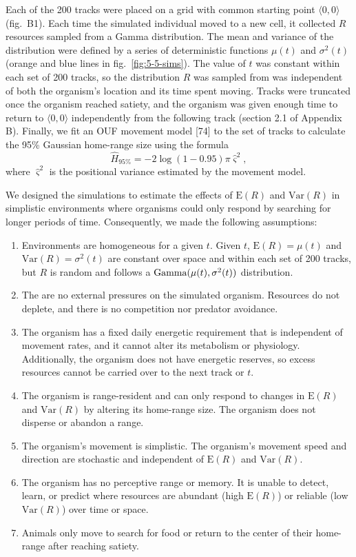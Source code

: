 \documentclass[
  12pt,
]{article}
\providecommand{\tightlist}{%
  \setlength{\itemsep}{0pt}\setlength{\parskip}{0pt}}
\begin{document}
Each of the 200 tracks were placed on a grid with common starting point \(\langle 0, 0\rangle\) (fig.~B1). Each time the simulated individual moved to a new cell, it collected \(R\) resources sampled from a Gamma distribution. The mean and variance of the distribution were defined by a series of deterministic functions \(\mu(t)\) and \(\sigma^2(t)\) (orange and blue lines in fig.~\ref{fig:5-5-sims}). The value of \(t\) was constant within each set of 200 tracks, so the distribution \(R\) was sampled from was independent of both the organism's location and its time spent moving. Tracks were truncated once the organism reached satiety, and the organism was given enough time to return to \(\langle 0, 0\rangle\) independently from the following track (section 2.1 of Appendix B). Finally, we fit an OUF movement model {[}74{]} to the set of tracks to calculate the 95\% Gaussian home-range size using the formula \[\hat{H}_{95\%} = -2 \log(1 - 0.95) \pi \hat \varsigma^2,\] where \(\hat \varsigma^2\) is the positional variance estimated by the movement model.

We designed the simulations to estimate the effects of \(\text{E}(R)\) and \(\text{Var}(R)\) in simplistic environments where organisms could only respond by searching for longer periods of time. Consequently, we made the following assumptions:

\begin{enumerate}
\def\labelenumi{\arabic{enumi})}
\tightlist
\item
  Environments are homogeneous for a given \(t\). Given \(t\), \(\text{E}(R) = \mu(t)\) and \(\text{Var}(R) = \sigma^2(t)\) are constant over space and within each set of 200 tracks, but \(R\) is random and follows a \(\text{Gamma}\large(\mu(t), \sigma^2(t)\large)\) distribution.
\item
  The are no external pressures on the simulated organism. Resources do not deplete, and there is no competition nor predator avoidance.
\item
  The organism has a fixed daily energetic requirement that is independent of movement rates, and it cannot alter its metabolism or physiology. Additionally, the organism does not have energetic reserves, so excess resources cannot be carried over to the next track or \(t\).
\item
  The organism is range-resident and can only respond to changes in \(\text{E}(R)\) and \(\text{Var}(R)\) by altering its home-range size. The organism does not disperse or abandon a range.
\item
  The organism's movement is simplistic. The organism's movement speed and direction are stochastic and independent of \(\text{E}(R)\) and \(\text{Var}(R)\).
\item
  The organism has no perceptive range or memory. It is unable to detect, learn, or predict where resources are abundant (high \(\text{E}(R)\)) or reliable (low \(\text{Var}(R)\)) over time or space.
\item
  Animals only move to search for food or return to the center of their home-range after reaching satiety.
\end{enumerate}
\end{document}
